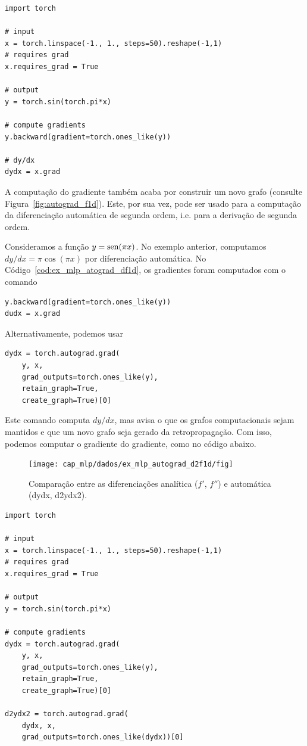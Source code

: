\begin{ex}
\begin{lstlisting}[caption=mlp\_autograd\_df1d, label=cod:ex_mlp_atograd_df1d]
import torch

# input
x = torch.linspace(-1., 1., steps=50).reshape(-1,1)
# requires grad
x.requires_grad = True

# output
y = torch.sin(torch.pi*x)

# compute gradients
y.backward(gradient=torch.ones_like(y))

# dy/dx
dydx = x.grad
\end{lstlisting}
\end{ex}

A computação do gradiente também acaba por construir um novo grafo (consulte Figura~\ref{fig:autograd_f1d}). Este, por sua vez, pode ser usado para a computação da diferenciação automática de segunda ordem, i.e. para a derivação de segunda ordem.

\begin{ex}\label{ex:mlp_autograd_d2f1d}
  Consideramos a função $y = \operatorname{sen}(\pi x)$. No exemplo anterior, computamos $dy/dx = \pi\cos(\pi x)$ por diferenciação automática. No Código~\ref{cod:ex_mlp_atograd_df1d}, os gradientes foram computados com o comando
\begin{lstlisting}
y.backward(gradient=torch.ones_like(y))
dudx = x.grad
\end{lstlisting}
  Alternativamente, podemos usar
\begin{lstlisting}
dydx = torch.autograd.grad(
    y, x,
    grad_outputs=torch.ones_like(y),
    retain_graph=True,
    create_graph=True)[0]
\end{lstlisting}
  Este comando computa $dy/dx$, mas avisa o {\pytorch} que os grafos computacionais sejam mantidos e que um novo grafo seja gerado da retropropagação. Com isso, podemos computar o gradiente do gradiente, como no código abaixo.

  \begin{figure}[H]
    \centering
    \texttt{[image: cap\_mlp/dados/ex\_mlp\_autograd\_d2f1d/fig]}
    \caption{Comparação entre as diferenciações analítica ($f'$, $f''$) e automática (dydx, d2ydx2).}
    \label{fig:ex_mlp_autograd_d2f1d}
  \end{figure}  

\begin{lstlisting}[caption=mlp\_autograd\_d2f1d]
import torch

# input
x = torch.linspace(-1., 1., steps=50).reshape(-1,1)
# requires grad
x.requires_grad = True

# output
y = torch.sin(torch.pi*x)

# compute gradients
dydx = torch.autograd.grad(
    y, x,
    grad_outputs=torch.ones_like(y),
    retain_graph=True,
    create_graph=True)[0]

d2ydx2 = torch.autograd.grad(
    dydx, x,
    grad_outputs=torch.ones_like(dydx))[0]
\end{lstlisting}
\end{ex}


